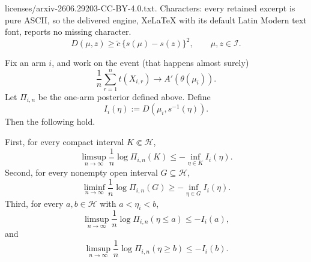 \documentclass[10pt,a4paper]{amsart}
\begin{document}
licenses/arxiv-2606.29203-CC-BY-4.0.txt. Characters: every retained excerpt is pure ASCII, so the delivered engine, XeLaTeX with its default Latin Modern text font, reports no missing character.
\begin{equation}
\label{eq:ckl-under-simple-upper}
    D(\mu,z)
    \ge
    \widetilde{c}\,\{s(\mu)-s(z)\}^2,
    \qquad \mu,z\in\mathcal I .
\end{equation}

\begin{lemma}
\label{lem:one-arm-laplace-simple-upper}
Fix an arm \(i\), and work on the event (that happens almost surely)
\[
    \frac1n\sum_{r=1}^nt(X_{i,r})
    \to
    A'(\theta(\mu_i)).
\]
Let \(\varPi_{i,n}\) be the one-arm posterior defined above.  Define
\[
    I_i(\eta):=D(\mu_i,s^{-1}(\eta)).
\]
Then the following hold.

First, for every compact interval \(K\Subset\mathcal H\),
\[
    \limsup_{n\to\infty}
    \frac1n\log\varPi_{i,n}(K)
    \le
    -\inf_{\eta\in K} I_i(\eta).
\]
Second, for every nonempty open interval \(G\subseteq\mathcal H\),
\[
    \liminf_{n\to\infty}
    \frac1n\log\varPi_{i,n}(G)
    \ge
    -\inf_{\eta\in G} I_i(\eta).
\]
Third, for every \(a,b\in\mathcal H\) with \(a<\eta_i<b\),
\[
    \limsup_{n\to\infty}
    \frac1n\log\varPi_{i,n}(\eta\le a)
    \le
    -I_i(a),
\]
and
\[
    \limsup_{n\to\infty}
    \frac1n\log\varPi_{i,n}(\eta\ge b)
    \le
    -I_i(b).
\]
\end{lemma}
\end{document}
